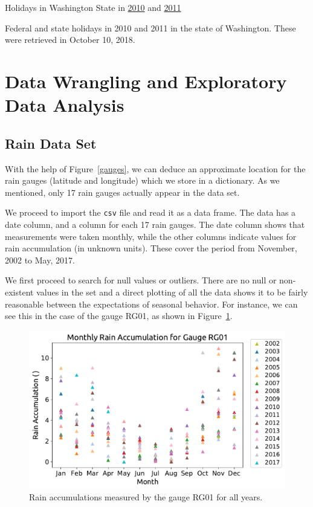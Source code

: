 \documentclass[12pt,a4paper]{article}
\begin{document}
{\large Holidays in Washington State in \href{https://www.officeholidays.com/countries/usa/regional.php?list_year=2010&list_region=washington}{2010} and \href{https://www.officeholidays.com/countries/usa/regional.php?list_year=2011&list_region=washington}{2011} \cite{OfficeHolidays2010,OfficeHolidays2011}}

Federal and state holidays in 2010 and 2011 in the state of Washington. These were retrieved in October 10, 2018.

\section{Data Wrangling and Exploratory Data Analysis}

\subsection{Rain Data Set}

With the help of Figure~\ref{gauges}, we can deduce an approximate location for the rain gauges (latitude and longitude) which we store in a dictionary. As we mentioned, only 17 rain gauges actually appear in the data set.

We proceed to import the \verb|csv| file and read it as a data frame. The data has a date column, and a column for each 17 rain gauges. The date column shows that measurements were taken monthly, while the other columns indicate values for rain accumulation (in unknown units). These cover the period from November, 2002 to May, 2017.

We first proceed to search for null values or outliers. There are no null or non-existent values in the set and a direct plotting of all the data shows it to be fairly reasonable between the expectations of seasonal behavior. For instance, we can see this in the case of the gauge RG01, as shown in Figure~\ref{RG01_Full}.

\begin{figure}[ht!]
\centering
\includegraphics[scale=0.6]{figs/RG01_Full.pdf}
\caption{Rain accumulations measured by the gauge RG01 for all years.}
\label{RG01_Full}
\end{figure}
\end{document}
